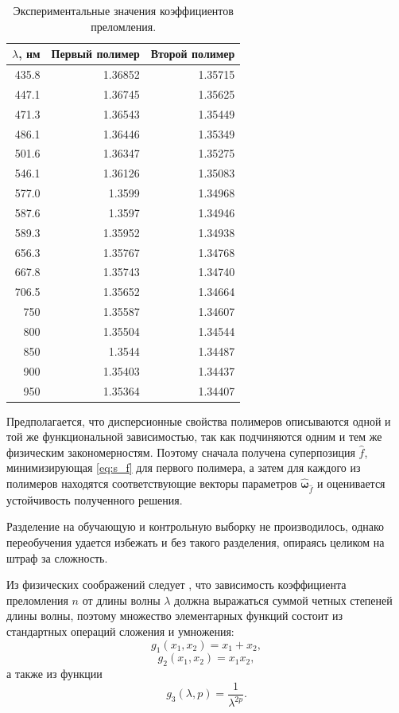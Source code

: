\documentclass[11pt,a4paper]{article}
\theoremstyle{definition}
\begin{document}
\begin{table}[h]
  \footnotesize
  \begin{tabular}{| r | r | r |} \hline
	$\lambda$, нм	& Первый полимер & Второй полимер \\ \hline
	435.8 & 1.36852 & 1.35715 \\ \hline
	447.1 & 1.36745 & 1.35625 \\ \hline
	471.3 & 1.36543 & 1.35449 \\ \hline
	486.1 & 1.36446 & 1.35349 \\ \hline
	501.6 & 1.36347 & 1.35275 \\ \hline
	546.1 & 1.36126 & 1.35083 \\ \hline
	577.0 & 1.3599 & 1.34968 \\ \hline
	587.6 & 1.3597 & 1.34946 \\ \hline
	589.3 & 1.35952 & 1.34938 \\ \hline
	656.3 & 1.35767 & 1.34768 \\ \hline
	667.8 & 1.35743 & 1.34740 \\ \hline
	706.5 & 1.35652 & 1.34664 \\ \hline
	750 & 1.35587 & 1.34607 \\ \hline
	800 & 1.35504 & 1.34544 \\ \hline
	850 & 1.3544 & 1.34487 \\ \hline
	900 & 1.35403 & 1.34437 \\ \hline
	950 & 1.35364 & 1.34407 \\ \hline
  \end{tabular}
  \caption{Экспериментальные значения коэффициентов преломления.}
  \label{tabl:source_data}
\end{table}

Предполагается, что дисперсионные свойства полимеров описываются одной и той
же функциональной зависимостью, так как подчиняются одним и тем же физическим
закономерностям. Поэтому сначала получена суперпозиция $\hat{f}$,
минимизирующая \eqref{eq:s_f} для первого полимера, а затем для каждого
из полимеров находятся соответствующие векторы параметров
$\hat{\boldsymbol{\omega}}_{\hat{f}}$ и оценивается устойчивость полученного решения.

Разделение на обучающую и контрольную выборку не производилось, однако переобучения
удается избежать и без такого разделения, опираясь целиком на штраф за сложность.

Из физических соображений следует \cite{Serova11}, что зависимость коэффициента
преломления $n$ от длины волны $\lambda$ должна выражаться суммой
четных степеней длины волны, поэтому множество элементарных функций состоит из
стандартных операций сложения и умножения:
\[
  g_1(x_1, x_2) = x_1 + x_2,
\]
\[
  g_2(x_1, x_2) = x_1 x_2,
\]
а также из функции
\[
  g_3(\lambda, p) = \frac{1}{\lambda^{2p}}.
\]
\end{document}
